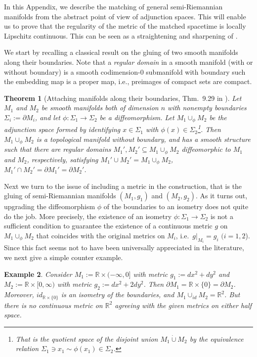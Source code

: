 \documentclass[11pt]{article}
\numberwithin{equation}{section}
\newtheorem{theorem}{Theorem}[section]
\newtheorem{example}[theorem]{Example}
\begin{document}
In this Appendix, we describe the matching of general semi-Riemannian manifolds from the abstract point of view of adjunction spaces. This will enable us to prove that the regularity of the metric of the matched spacetime is locally Lipschitz continuous. This can be seen as a straightening and sharpening of \cite[Sec.\ 3, Prop.]{clarke1987junction}. 

We start by recalling a classical result on the gluing of two smooth manifolds along their boundaries. Note that a \textit{regular domain} in a smooth manifold (with or without boundary) is a smooth codimension-$0$ submanifold with boundary such the embedding map is a proper map, i.e., preimages of compact sets are compact.

\begin{theorem}[Attaching manifolds along their boundaries, Thm.\ 9.29 in \cite {lee2003introduction}]
    Let $M_1$ and $M_2$ be smooth manifolds both of dimension $n$ with nonempty boundaries $\Sigma_i := \partial M_i$, and let $\phi: \Sigma_1 \to \Sigma_2$ be a diffeomorphism. Let $M_1 \cup_{\phi} M_2$ be the adjunction space formed by identifying $x \in \Sigma_1$ with $\phi(x) \in \Sigma_2$\footnote{That is the quotient space of the disjoint union $M_1\dot\cup M_2$ by the equivalence relation $\Sigma_1\ni x_1\sim \phi(x_1)\in \Sigma_2$.}. Then $M_1 \cup_{\phi} M_2$ is a topological manifold without boundary, and has a smooth structure such that there are regular domains $M_1',M_2' \subseteq M_1 \cup_{\phi} M_2$ diffeomorphic to $M_1$ and $M_2$, respectively, satisfying $M_1' \cup M_2' = M_1 \cup_{\phi} M_2$, $M_1' \cap M_2' = \partial M_1' = \partial M_2'$.
\end{theorem}

Next we turn to the issue of including a metric in the construction, that is the gluing of semi-Riemannian manifolds $(M_1,g_1)$ and $(M_2,g_2)$. As it turns out, upgrading the diffeomorphism $\phi$ of the boundaries to an isometry does not quite do the job. More precisely, the existence of an isometry $\phi:\Sigma_1\to\Sigma_2$ is not a sufficient condition to guarantee the existence of a continuous metric $g$ on $M_1 \cup_{\phi} M_2$ that coincides with the original metrics on $M_i$, i.e.\ $g|_{M_i}=g_i$ $(i=1,2$). Since this fact seems not to have been universally appreciated in the literature, we next give a simple counter example. 


\begin{example}
    Consider $M_1:=\mathbb{R} \times (-\infty,0]$ with metric $g_1:=dx^2 + dy^2$ and $M_2:=\mathbb{R} \times [0,\infty)$ with metric $g_2:=dx^2 + 2dy^2$. Then $\partial M_1 = \mathbb{R} \times \{0\} = \partial M_2$. Moreover, $id_{\mathbb{R} \times \{0\}}$ is an isometry of the boundaries, and $M_1 \cup_{id} M_2 = \mathbb{R}^2$. But there is no continuous metric on $\mathbb{R}^2$ agreeing with the given metrics on either half space.
\end{example}
\end{document}
